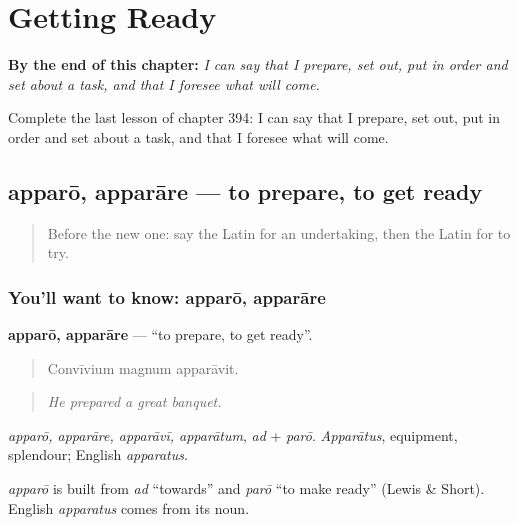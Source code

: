 
\chapter{Getting Ready}
\label{ch:la-getting-ready}

\begin{chapteropening}
\textbf{By the end of this chapter:} \emph{I can say that I prepare, set out, put in order and set about a task, and that I foresee what will come.}

Complete the last lesson of chapter 394: I can say that I prepare, set out, put in order and set about a task, and that I foresee what will come.
\end{chapteropening}

\section[apparō, apparāre]{apparō, apparāre — to prepare, to get ready}

\label{lesson:LA-C394-apparo}



\begin{quote}
Before the new one: say the Latin for an undertaking, then the Latin for to try.
\end{quote}

\subsection*{You'll want to know: apparō, apparāre}
\textbf{apparō, apparāre} — \textquotedblleft{}to prepare, to get ready\textquotedblright{}.

\begin{quote}
Convīvium magnum apparāvit.
\end{quote}

\begin{quote}
\emph{He prepared a great banquet.}
\end{quote}

\emph{apparō, apparāre, apparāvī, apparātum}, \emph{ad} + \emph{parō}. \emph{Apparātus}, equipment, splendour; English \emph{apparatus}.

\begin{cousinweb}
\emph{apparō} is built from \emph{ad} \textquotedblleft{}towards\textquotedblright{} and \emph{parō} \textquotedblleft{}to make ready\textquotedblright{} (Lewis \& Short). English \emph{apparatus} comes from its noun.
\end{cousinweb}

